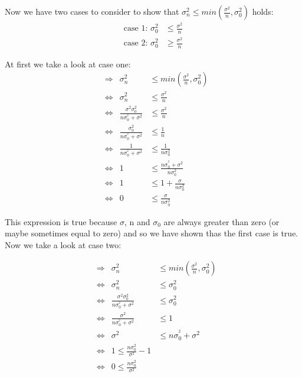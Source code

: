Now we have two cases to consider to show that $\sigma^{2}_{n}\le min\left(\frac{\sigma^{2}}{n},\sigma^{2}_{0}\right)$ holds:
\begin{align}
    \text{case 1: } \sigma^{2}_{0}&\le\frac{\sigma^{2}}{n}\\
    \text{case 2: } \sigma^{2}_{0}&\ge\frac{\sigma^{2}}{n}
\end{align}

At first we take a look at case one:\\

\begin{align*}
    &\Rightarrow&\sigma^{2}_{n}&\le min\left(\frac{\sigma^{2}}{n},\sigma^{2}_{0}\right)\\
    &\Leftrightarrow&\sigma^{2}_{n}&\le\frac{\sigma^{2}}{n}\\
    &\Leftrightarrow& \frac{\sigma^2\sigma^{2}_{0}}{n\sigma^{^2}_{0}+\sigma^{2}} &\le\frac{\sigma^{2}}{n}\\
    &\Leftrightarrow& \frac{\sigma^{2}_{0}}{n\sigma^{^2}_{0}+\sigma^{2}} &\le\frac{1}{n}\\
    &\Leftrightarrow& \frac{1}{n\sigma^{^2}_{0}+\sigma^{2}} &\le\frac{1}{n\sigma^{2}_{0}}\\
    &\Leftrightarrow& 1 &\le\frac{n\sigma^{^2}_{0}+\sigma^{2}}{n\sigma^{2}_{0}}\\
    &\Leftrightarrow& 1 &\le 1+\frac{\sigma}{n\sigma^{2}_{0}}\\
    &\Leftrightarrow& 0 &\le \frac{\sigma}{n\sigma^{2}_{0}}
\end{align*}

This expression is true because $\sigma$, n and $\sigma_{0}$ are always greater than zero (or maybe sometimes equal to zero) and so we have shown thas the first case is true.\\
Now we take a look at case two:

\begin{align*}
    &\Rightarrow&\sigma^{2}_{n}&\le min\left(\frac{\sigma^{2}}{n},\sigma^{2}_{0}\right)\\
    &\Leftrightarrow&\sigma^{2}_{n}&\le\sigma^{2}_{0}\\
    &\Leftrightarrow& \frac{\sigma^2\sigma^{2}_{0}}{n\sigma^{^2}_{0}+\sigma^{2}} &\le\sigma^{2}_{0}\\
    &\Leftrightarrow& \frac{\sigma^2}{n\sigma^{^2}_{0}+\sigma^{2}} &\le 1\\
    &\Leftrightarrow&\sigma^2&\le n\sigma^{^2}_{0}+\sigma^{2}\\
    &\Leftrightarrow& 1\le\frac{n\sigma^{2}_{0}}{\sigma^{2}}-1\\
    &\Leftrightarrow& 0\le\frac{n\sigma^{2}_{0}}{\sigma^{2}}
\end{align*}

